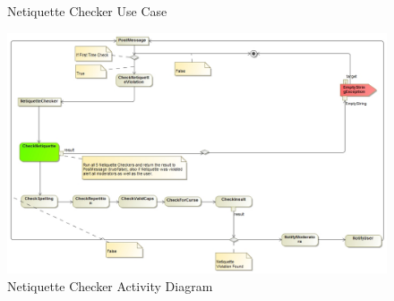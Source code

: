 \documentclass[11pt]{article}
\begin{document}
\begin{enumerate}
\begin{itemize}
\begin{figure}[H]
	  			\caption{Netiquette Checker Use Case}
	  		\end{figure}
	  		\begin{figure}[H]
	  			\includegraphics[scale=0.35,center]{NetProcessDiagram.jpg}
	  			\caption{Netiquette Checker Activity Diagram}
	  		\end{figure}
	  	\end{itemize}

\end{enumerate}
\newpage
\end{document}

